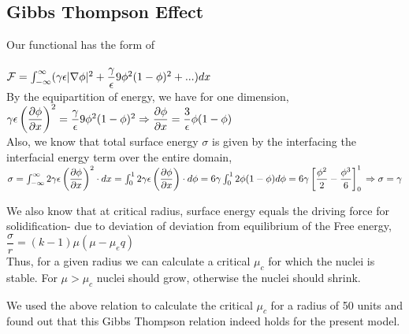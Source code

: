 \documentclass[a4paper]{report}
\begin{document}
\subsection*{Gibbs Thompson Effect}

Our functional has the form of\\
\\
${\cal F} = \int_{-\infty}^{\infty}(\gamma \epsilon|\nabla\phi|^2 + \dfrac{\gamma}{\epsilon}9\phi^2(1-\phi)^2 + ...)dx$\\
By the equipartition of energy, we have for one dimension,\\

$\gamma\epsilon\left(\dfrac{\partial\phi}{\partial x}\right)^2 = \dfrac{\gamma}{\epsilon}9\phi^2(1-\phi)^2\\
\Rightarrow \dfrac{\partial\phi}{\partial x} = \dfrac{3}{\epsilon}\phi(1-\phi)$\\

Also, we know that total surface energy $\sigma$ is given by the interfacing the interfacial 
energy term over the entire domain,\\
$\sigma = \int_{-\infty}^{\infty}2\gamma\epsilon\left(\dfrac{\partial\phi}{\partial x}\right)^2\cdot dx\\
= \int_{0}^{1}2\gamma\epsilon\left(\dfrac{\partial\phi}{\partial x}\right)\cdot d\phi\\
= 6\gamma\int_{0}^{1}2\phi(1-\phi) d\phi\\
= 6\gamma \left[\dfrac{\phi^2}{2} - \dfrac{\phi^3}{6}\right]_{0}^{1}\\
\Rightarrow \sigma = \gamma\\
$

We also know that at critical radius, surface energy equals the driving force for solidification- 
due to deviation of deviation from equilibrium of the Free energy,
 \\ 
$\dfrac{\sigma}{r} = (k-1)\mu\left(\mu-\mu_eq\right)$ \\
Thus, for a given radius we can calculate a critical $\mu_c$ for which the nuclei is 
stable. For $\mu > \mu_c$ nuclei should grow, otherwise the nuclei should shrink.
 
We used the above relation to calculate the critical $\mu_c$ for a 
radius of 50 units and found out that this Gibbs Thompson relation indeed holds for 
the present model.
\end{document}

